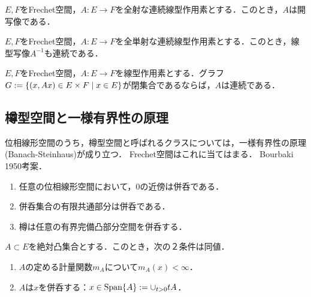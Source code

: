 \documentclass[uplatex,dvipdfmx]{jsreport}
\begin{document}
\begin{theorem}[開写像定理]
    $E,F$をFrechet空間，$A:E\to F$を全射な連続線型作用素とする．このとき，$A$は開写像である．
\end{theorem}

\begin{corollary}[逆写像定理]
    $E,F$をFrechet空間，$A:E\to F$を全単射な連続線型作用素とする．このとき，線型写像$A^{-1}$も連続である．
\end{corollary}

\begin{theorem}[閉グラフ定理]
    $E,F$をFrechet空間，$A:E\to F$を線型作用素とする．グラフ$G:=\left\{(x,Ax)\in E\times F\mid x\in E\right\}$が閉集合であるならば，$A$は連続である．
\end{theorem}

\subsection{樽型空間と一様有界性の原理}

\begin{tcolorbox}[colframe=ForestGreen, colback=ForestGreen!10!white,breakable,colbacktitle=ForestGreen!40!white,coltitle=black,fonttitle=\bfseries\sffamily,
title=]
    位相線形空間のうち，樽型空間と呼ばれるクラスについては，一様有界性の原理(Banach-Steinhaus)が成り立つ．
    Frechet空間はこれに当てはまる．
    Bourbaki 1950考案．
\end{tcolorbox}


\begin{lemma}\mbox{}
    \begin{enumerate}
        \item 任意の位相線形空間において，$0$の近傍は併呑である．
        \item 併呑集合の有限共通部分は併呑である．
        \item 樽は任意の有界完備凸部分空間を併呑する．
    \end{enumerate}
\end{lemma}

\begin{lemma}[併呑性の特徴付け]\label{lemma-characterizing-absorbant}
    $A\subset E$を絶対凸集合とする．このとき，次の２条件は同値．
    \begin{enumerate}
        \item $A$の定める計量関数$m_A$について$m_A(x)<\infty$．
        \item $A$は$x$を併呑する：$x\in\mathrm{Span}\{A\}:=\cup_{t>0}tA$．
    \end{enumerate}
\end{lemma}
\end{document}
